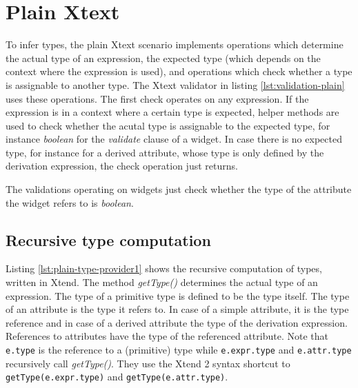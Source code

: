 \section{Plain Xtext}

To infer types, the plain Xtext scenario implements operations which determine the actual type of an expression, the expected type (which depends on the context where the expression is used), and operations which check whether a type is assignable to another type. The Xtext validator in listing \ref{lst:validation-plain} uses these operations. The first check operates on any expression. If the expression is in a context where a certain type is expected, helper methods are used to check whether the acutal type is assignable to the expected type, for instance \emph{boolean} for the \emph{validate} clause of a widget. 
In case there is no expected type, for instance for a derived attribute, whose type is only defined by the derivation expression, the check operation just returns.

The validations operating on widgets just check whether the type of the attribute the widget refers to is \emph{boolean}.



\subsection{Recursive type computation}

Listing \ref{lst:plain-type-provider1} shows the recursive computation of types, written in Xtend. The method \emph{getType()} determines the actual type of an expression. The type of a primitive type is defined to be the type itself. The type of an attribute is the type it refers to. In case of a simple attribute, it is the type reference and in case of a derived attribute the type of the derivation expression. References to attributes have the type of the referenced attribute. Note that \verb|e.type| is the reference to a (primitive) type while \verb|e.expr.type| and \verb|e.attr.type| recursively call \emph{getType()}. They use the Xtend 2 syntax shortcut to \verb|getType(e.expr.type)| and \verb|getType(e.attr.type)|.



